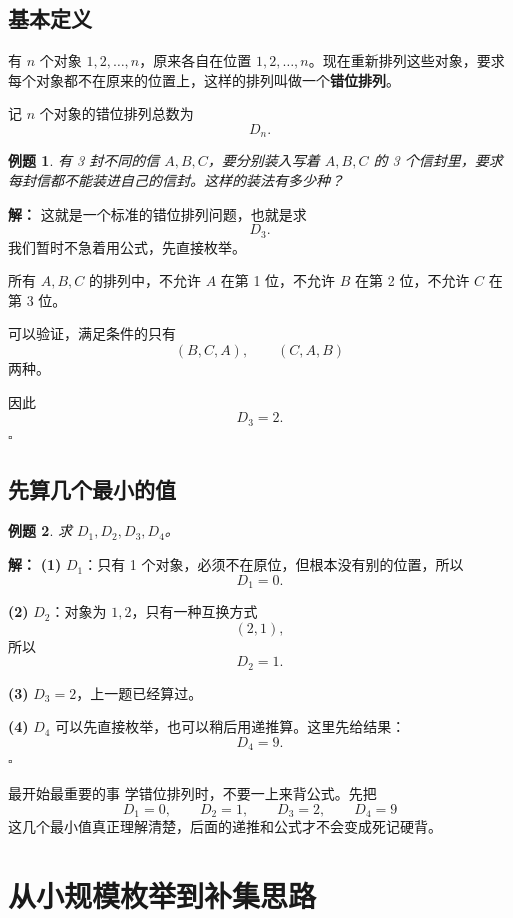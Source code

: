 \documentclass[11pt,a4paper,fontset=fandol]{ctexart}
\theoremstyle{formaltheorem}
\theoremstyle{formalexample}
\newtheorem{example}{例题}[section]
\newenvironment{solution}{\par\noindent\textbf{解：}}{\hfill$\square$\par}
\newcommand{\Dn}{D_n}
\begin{document}
\subsection{基本定义}

有 $n$ 个对象 $1,2,\ldots,n$，原来各自在位置 $1,2,\ldots,n$。现在重新排列这些对象，要求每个对象都不在原来的位置上，这样的排列叫做一个\textbf{错位排列}。

记 $n$ 个对象的错位排列总数为
\[
\Dn.
\]

\begin{example}
有 3 封不同的信 $A,B,C$，要分别装入写着 $A,B,C$ 的 3 个信封里，要求每封信都不能装进自己的信封。这样的装法有多少种？
\end{example}

\begin{solution}
这就是一个标准的错位排列问题，也就是求
\[
D_3.
\]
我们暂时不急着用公式，先直接枚举。

所有 $A,B,C$ 的排列中，不允许 $A$ 在第 1 位，不允许 $B$ 在第 2 位，不允许 $C$ 在第 3 位。

可以验证，满足条件的只有
\[
(B,C,A),\qquad (C,A,B)
\]
两种。

因此
\[
D_3=2.
\]
\end{solution}

\subsection{先算几个最小的值}

\begin{example}
求 $D_1,D_2,D_3,D_4$。
\end{example}

\begin{solution}
\textbf{(1) }$D_1$：只有 1 个对象，必须不在原位，但根本没有别的位置，所以
\[
D_1=0.
\]

\textbf{(2) }$D_2$：对象为 $1,2$，只有一种互换方式
\[
(2,1),
\]
所以
\[
D_2=1.
\]

\textbf{(3) }$D_3=2$，上一题已经算过。

\textbf{(4) }$D_4$ 可以先直接枚举，也可以稍后用递推算。这里先给结果：
\[
D_4=9.
\]
\end{solution}

\begin{skillbox}{最开始最重要的事}
学错位排列时，不要一上来背公式。先把
\[
D_1=0,\qquad D_2=1,\qquad D_3=2,\qquad D_4=9
\]
这几个最小值真正理解清楚，后面的递推和公式才不会变成死记硬背。
\end{skillbox}

\section{从小规模枚举到补集思路}
\end{document}
